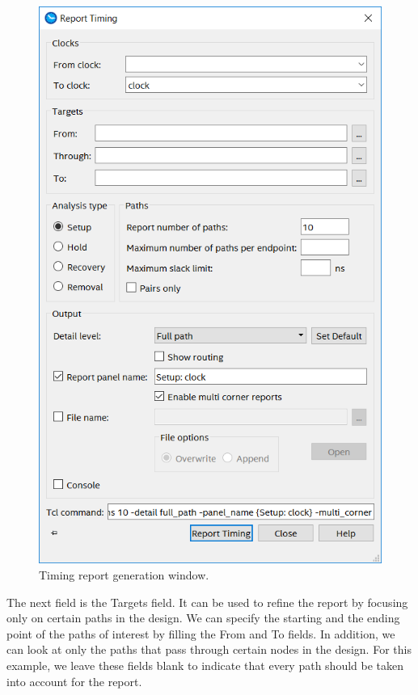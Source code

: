 \documentclass[11pt, twoside, pdftex]{article}
\begin{document}
\begin{figure}[H]
\begin{center}
\includegraphics[scale=0.4]{figures/figure9.png}
\end{center}
\caption{Timing report generation window.}
\label{fig:9}
\end{figure}

The next field is the {\sf Targets} field. It can be used to refine the report by focusing 
only on certain paths in the design. We can specify the starting
and the ending point of the paths of interest by filling the {\sf From} and {\sf To} fields. 
In addition, we can look at only the paths that pass through certain
nodes in the design. For this example, we leave these fields blank to indicate that every path 
should be taken into account for the report.
\end{document}
